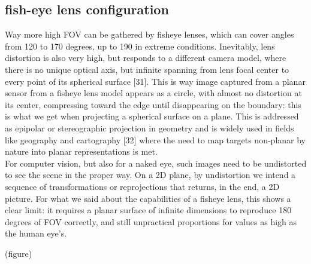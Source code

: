 \iffalse
TOED-IN
(-) edge violation, "see through a window" effect (lower immersion)
(-) keystoning effect at edges, but reducible
(+) compensate the low stereo cues area of parallel config
(+) easy to implement
(+) good vertical disparities (VSR)
\fi

\subsection{fish-eye lens configuration}
Way more high FOV can be gathered by fisheye lenses, which can cover angles from 120 to 170 degrees, up to 190 in extreme conditions. Inevitably, lens distortion is also very high, but responds to a different camera model, where there is no unique optical axis, but infinite spanning from lens focal center to every point of its spherical surface [31]. This is way image captured from a planar sensor from a fisheye lens model appears as a circle, with almost no distortion at its center, compressing toward the edge until disappearing on the boundary: this is what we get when projecting a spherical surface on a plane. This is addressed as epipolar or stereographic projection in geometry and is widely used in fields like geography and cartography [32] where the need to map targets non-planar by nature into planar representations is met.\\
For computer vision, but also for a naked eye, such images need to be undistorted to see the scene in the proper way. On a 2D plane, by undistortion we intend a sequence of transformations or reprojections that returns, in the end, a 2D picture. For what we said about the capabilities of a fisheye lens, this shows a clear limit: it requires a planar surface of infinite dimensions to reproduce 180 degrees of FOV correctly, and still unpractical proportions for values as high as the human eye's.

(figure)

